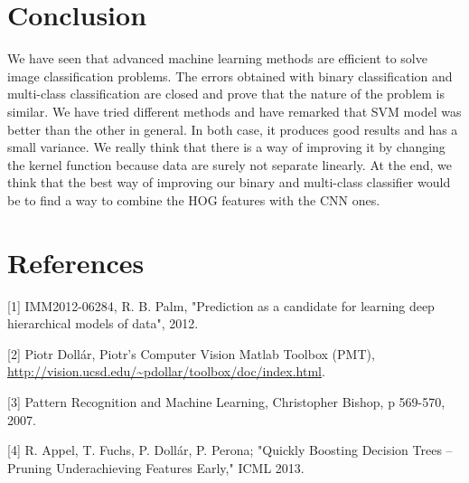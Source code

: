 \documentclass{article} %
\begin{document}
\section{Conclusion}

We have seen that advanced machine learning methods are efficient to solve image classification problems. The errors obtained with binary classification and multi-class classification are closed and prove that the nature of the problem is similar. We have tried different methods and have remarked that SVM model was better than the other in general. In both case, it produces good results and has a small variance. We really think that there is a way of improving it by changing the kernel function because data are surely not separate linearly. At the end, we think that the best way of improving our binary and multi-class classifier would be to find a way to combine the HOG features with the CNN ones. 

\section{References}

[1]    IMM2012-06284, R. B. Palm, "Prediction as a candidate for learning deep hierarchical models of data", 2012.


[2]    Piotr Doll\'ar, {P}iotr's {C}omputer {V}ision {M}atlab {T}oolbox ({PMT}), \url{http://vision.ucsd.edu/~pdollar/toolbox/doc/index.html}. 


[3]    Pattern Recognition and Machine Learning, Christopher Bishop, p 569-570, 2007.


[4]    R. Appel, T. Fuchs, P. Dollár, P. Perona; "Quickly Boosting Decision Trees – Pruning Underachieving Features Early," ICML 2013.
\end{document}
